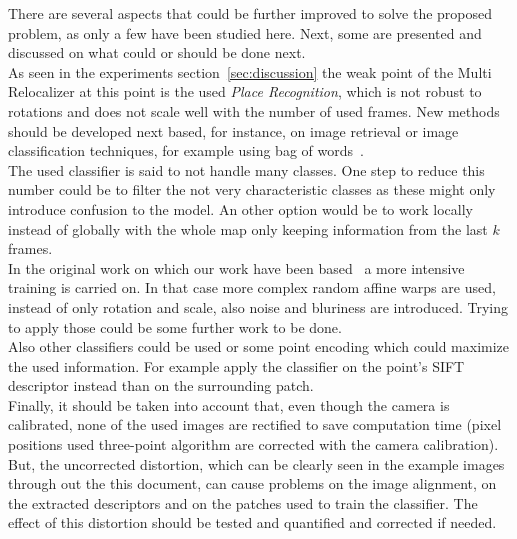 There are several aspects that could be further improved to solve the proposed problem, as only a few have been studied here. Next, some are presented and discussed on what could or should be done next.\\

As seen in the experiments section~\ref{sec:discussion} the weak point of the Multi Relocalizer at this point is the used \textit{Place Recognition}, which is not robust to rotations and does not scale well with the number of used frames. New methods should be developed next based, for instance, on image retrieval or image classification techniques, for example using bag of words~\cite{yang2007evaluating}. \\

The used classifier is said to not handle many classes. One step to reduce this number could  be to filter  the not very characteristic classes as these might only introduce confusion to the model. An other option would be to work locally instead of globally with the whole map only keeping information from the last $k$ frames.\\

In the original work on which our work have been based~\cite{Ozuysal2010} a more intensive training is carried on. In that case more complex random affine warps are used, instead of only rotation and scale, also noise and bluriness are introduced. Trying to apply those could be some further work to be done.\\

Also other classifiers could be used or some point encoding which could maximize the used information. For example apply the classifier on the point's SIFT descriptor instead than on the surrounding patch.\\

Finally, it should be taken into account that, even though the camera is calibrated, none of the used images are rectified to save computation time (pixel positions used three-point algorithm are corrected with the camera calibration). But, the uncorrected distortion, which can be clearly seen in the example images through out the this document, can cause problems on the image alignment, on the extracted descriptors and on the patches used to train the classifier. The effect of this distortion should be tested and quantified and  corrected if needed.\\



